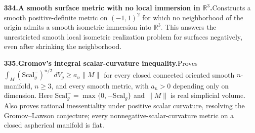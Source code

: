 \documentclass[11pt,a4paper]{article}
\begin{document}
  \par \begin{minipage}{\linewidth}
  \fontsize{10.5}{12.6}\selectfont\RaggedRight
  \hypertarget{result 334}{}
  {\bfseries\textcolor{muted}{334.}\enspace A smooth surface metric with no local immersion in $\mathbb R^3$.}\enspace Constructs a smooth positive-definite metric on $(-1,1)^2$ for which no neighborhood of the origin admits a smooth isometric immersion into $\mathbb R^3$. This answers the unrestricted smooth local isometric realization problem for surfaces negatively, even after shrinking the neighborhood.\par
  \end{minipage}\par\vspace{5pt}



  \par \begin{minipage}{\linewidth}
  \fontsize{10.5}{12.6}\selectfont\RaggedRight
  \hypertarget{result 335}{}
  {\bfseries\textcolor{muted}{335.}\enspace Gromov's integral scalar-curvature inequality.}\enspace Proves $\int_M(\mathrm{Scal}_g^-)^{n/2}\,dV_g\ge a_n\lVert M\rVert$ for every closed connected oriented smooth $n$-manifold, $n\ge3$, and every smooth metric, with $a_n>0$ depending only on dimension. Here $\mathrm{Scal}_g^-=\max\{0,-\mathrm{Scal}_g\}$ and $\lVert M\rVert$ is real simplicial volume. Also proves rational inessentiality under positive scalar curvature, resolving the Gromov--Lawson conjecture; every nonnegative-scalar-curvature metric on a closed aspherical manifold is flat.\par
  \end{minipage}\par\vspace{5pt}
\end{document}
